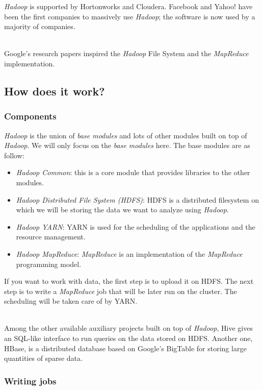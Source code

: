 \documentclass[a4paper, 12pt]{article}
\begin{document}
\textit{Hadoop} is supported by Hortonworks and Cloudera. Facebook and Yahoo! have been the first companies to massively use \textit{Hadoop}; the software is now used by a majority of companies.

~\\
Google's research papers inspired the \textit{Hadoop} File System and the \textit{MapReduce} implementation.

  \subsection{How does it work?}

    \subsubsection{Components}
  
\textit{Hadoop} is the union of \textit{base modules} and lots of other modules built on top of \textit{Hadoop}. We will only focus on the \textit{base modules} here. The base modules are as follow:
\begin{itemize}
  \item \textit{\textit{Hadoop} Common}: this is a core module that provides libraries to the other modules.
  \item \textit{\textit{Hadoop} Distributed File System (HDFS)}: HDFS is a distributed filesystem on which we will be storing the data we want to analyze using \textit{Hadoop}.
  \item \textit{\textit{Hadoop} YARN}: YARN is used for the scheduling of the applications and the resource management.
  \item \textit{\textit{Hadoop} MapReduce}: \textit{MapReduce} is an implementation of the \textit{MapReduce} programming model.
\end{itemize}

If you want to work with data, the first step is to upload it on HDFS. The next step is to write a \textit{MapReduce} job that will be later run on the cluster. The scheduling will be taken care of by YARN.

~\\
Among the other available auxiliary projects built on top of \textit{Hadoop}, Hive gives an SQL-like interface to run queries on the data stored on HDFS. Another one, HBase, is a distributed database based on Google's BigTable for storing large quantities of sparse data.

    \subsubsection{Writing jobs}
\end{document}
